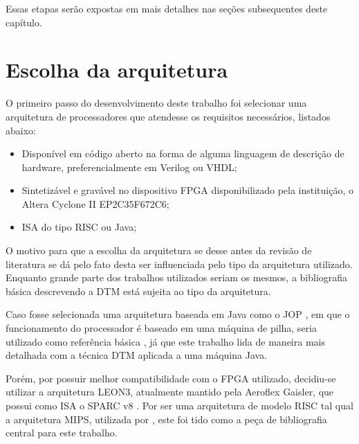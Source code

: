 Essas etapas serão expostas em mais detalhes nas seções subsequentes deste capítulo.

\section{Escolha da arquitetura} 
\label{Metodologia:Arquitetura}

O primeiro passo do desenvolvimento deste trabalho foi selecionar uma arquitetura de processadores que atendesse os requisitos necessários, listados abaixo:

\begin{itemize}
	
	\item Disponível em código aberto na forma de alguma linguagem de descrição de hardware, preferencialmente em Verilog ou VHDL;
	
	\item Sintetizável e gravável no dispositivo FPGA disponibilizado pela instituição, o Altera Cyclone II EP2C35F672C6;
	
	\item ISA do tipo RISC ou Java;
	
	
\end{itemize}

O motivo para que a escolha da arquitetura se desse antes da revisão de literatura se dá pelo fato desta ser influenciada pelo tipo da arquitetura utilizado. Enquanto grande parte dos trabalhos utilizados seriam os mesmos, a bibliografia básica descrevendo a DTM está sujeita ao tipo da arquitetura.

Caso fosse selecionada uma arquitetura baseada em Java como o JOP \cite{schoeberl2005jop}, em que o funcionamento do processador é baseado em uma máquina de pilha, seria utilizado como referência básica , já que este trabalho lida de maneira mais detalhada com a técnica DTM aplicada a uma máquina Java.

Porém, por possuir melhor compatibilidade com o FPGA utilizado, decidiu-se utilizar a arquitetura LEON3, atualmente mantido pela Aeroflex Gaisler, que possui como ISA o SPARC v8 \cite{gaisler2010leon3}. Por ser uma arquitetura de modelo RISC tal qual a arquitetura MIPS, utilizada por , este foi tido como a peça de bibliografia central para este trabalho.


